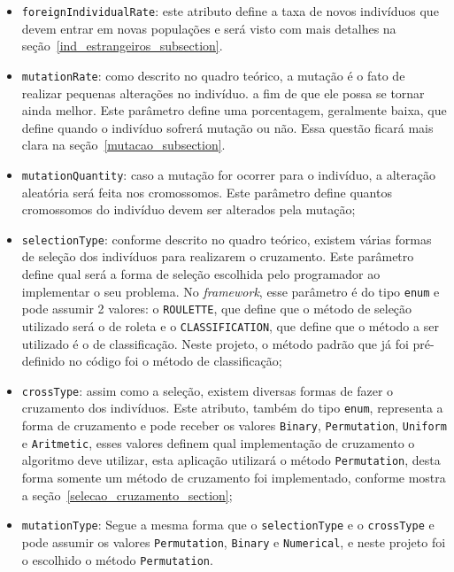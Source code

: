 \begin{itemize}
\begin{itemize}
		\item \texttt{foreignIndividualRate}:
		este atributo define a taxa de novos indivíduos que devem entrar em novas
		populações e será visto com mais detalhes na seção~\ref{ind_estrangeiros_subsection}.
		
		\item \texttt{mutationRate}:
		como descrito no quadro teórico, a mutação é o fato de realizar pequenas
		alterações no indivíduo. a fim de que ele possa se tornar ainda melhor. Este parâmetro define uma porcentagem, geralmente baixa, que define quando o indivíduo sofrerá mutação ou não. Essa questão ficará mais clara na seção~\ref{mutacao_subsection}.
		
		\item \texttt{mutationQuantity}:
		caso a mutação for ocorrer para o indivíduo, a alteração aleatória será feita
		nos cromossomos. Este parâmetro define quantos cromossomos do indivíduo devem ser 
		alterados pela mutação;
		
		\item \texttt{selectionType}:
		conforme descrito no quadro teórico, existem várias formas de seleção dos
		indivíduos para realizarem o cruzamento. Este parâmetro define qual será a forma de seleção escolhida pelo programador ao
		implementar o seu problema. No \textit{framework}, esse parâmetro é do tipo \texttt{enum} e pode assumir 2 valores: o
		\texttt{ROULETTE}, que define que o método de seleção utilizado será o de roleta e o \texttt{CLASSIFICATION}, que 
		define que o método a ser utilizado é o de classificação. Neste projeto, o
		método padrão que já foi pré-definido no código foi o método de classificação;
		
		\item \texttt{crossType}:
		assim como a seleção, existem diversas formas de fazer o cruzamento dos indivíduos. Este atributo, 
		também do tipo \texttt{enum}, representa a forma de cruzamento e pode receber os valores \texttt{Binary}, 
		\texttt{Permutation}, \texttt{Uniform} e \texttt{Aritmetic}, esses valores
		definem qual implementação de cruzamento o algoritmo deve utilizar, esta aplicação
		utilizará o método \texttt{Permutation}, desta forma somente um método de cruzamento foi implementado, conforme 
		mostra a seção~\ref{selecao_cruzamento_section};
		
		\item \texttt{mutationType}:
		Segue a mesma forma que o \texttt{selectionType} e o \texttt{crossType} e pode assumir os valores \texttt{Permutation}, 
		\texttt{Binary} e \texttt{Numerical}, e neste projeto foi o escolhido o método \texttt{Permutation}.
		

\end{itemize}
\end{itemize}
